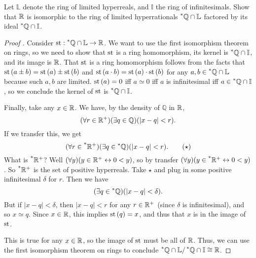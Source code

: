 \begin{thm}
    Let $\mathbb{L}$ denote the ring of limited hyperreals, and $\mathbb{I}$ the ring of infinitesimals. Show that $\mathbb{R}$ is isomorphic to the ring of limited hyperrationals $\prescript{*}{}{\mathbb{Q}} \cap \mathbb{L}$ factored by its ideal $\prescript{*}{}{\mathbb{Q}} \cap \mathbb{I}$.
\end{thm}

\begin{proof}[Proof ]
    Consider $\operatorname{st}: \prescript{*}{}{\mathbb{Q}} \cap \mathbb{L} \to \mathbb{R}$. We want to use the first isomorphism theorem on rings, so we need to show that $\operatorname{st}$ is a ring homomorphism, its kernel is $\prescript{*}{}{\mathbb{Q}} \cap \mathbb{I}$, and its image is $\mathbb{R}$. That $\operatorname{st}$ is a ring homomorphism follows from the facts that $\operatorname{st}\left(a \pm b\right) = \operatorname{st}\left(a\right) \pm \operatorname{st}\left(b\right)$ and $\operatorname{st}\left(a \cdot b\right) = \operatorname{st}\left(a\right) \cdot \operatorname{st}\left(b\right)$ for any $a, b \in \prescript{*}{}{\mathbb{Q}} \cap \mathbb{L}$ because such $a, b$ are limited. $\operatorname{st}\left(a\right) = 0$ iff $a \simeq 0$ iff $a$ is infinitesimal iff $a \in \prescript{*}{}{\mathbb{Q}} \cap \mathbb{I}$, so we conclude the kernel of $\operatorname{st}$ is $\prescript{*}{}{\mathbb{Q}} \cap \mathbb{I}$. 

    Finally, take any $x \in \mathbb{R}$. We have, by the density of $\mathbb{Q}$ in $\mathbb{R}$,
    \[ (\forall r \in \mathbb{R}^+)(\exists q \in \mathbb{Q})(|x - q| < r). \]
    If we transfer this, we get
    \[ (\forall r \in \prescript{*}{}{\mathbb{R}^+})(\exists q \in \prescript{*}{}{\mathbb{Q}})(|x - q| < r). \tag{$\star$}\] 
    What is $\prescript{*}{}{\mathbb{R}^+}$? Well $(\forall y)(y \in \mathbb{R}^+ \leftrightarrow 0 < y)$, so by transfer $(\forall y)(y \in \prescript{*}{}{\mathbb{R}^+} \leftrightarrow 0 < y)$. So $\prescript{*}{}{\mathbb{R}^+}$ is the set of positive hyperreals. Take $\star$ and plug in some positive infinitesimal $\delta$ for $r$. Then we have
    \[ (\exists q \in \prescript{*}{}{\mathbb{Q}})(|x - q| < \delta). \]
    But if $|x - q| < \delta$, then $|x - q| < r$ for any $r \in \mathbb{R}^+$ (since $\delta$ is infinitesimal), and so $x \simeq q$. Since $x \in \mathbb{R}$, this implies $\operatorname{st}\left(q\right) = x$, and thus that $x$ is in the image of $\operatorname{st}$. 
    
    This is true for any $x \in \mathbb{R}$, so the image of $\operatorname{st}$ must be all of $\mathbb{R}$. Thus, we can use the first isomorphism theorem on rings to conclude $\prescript{*}{}{\mathbb{Q}} \cap \mathbb{L} / \prescript{*}{}{\mathbb{Q}} \cap \mathbb{I} \cong \mathbb{R}$.
\end{proof}

